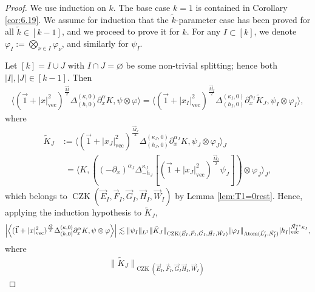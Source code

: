 \documentclass[11pt, reqno]{amsart}
\theoremstyle{definition}
\theoremstyle{remark}
\numberwithin{equation}{section}
\newcommand{\vE}{\vec E}
\newcommand{\vF}{\vec F}
\newcommand{\Bpair}[2]{\Big\langle #1, #2 \Big\rangle}
\newcommand{\abs}[1]{|#1|}
\newcommand{\Babs}[1]{\Big|#1\Big|}
\newcommand{\Norm}[2]{\|#1\|_{#2}}
\begin{document}
\begin{proof}
We use induction on $k$. The base case $k=1$ is contained in Corollary \ref{cor:6.19}. We assume for induction that the $\tilde k$-parameter case has been proved for all $\tilde k\in[k-1]$, and we proceed to prove it for $k$. For any $I\subset[k]$, we denote $\varphi_I:=\bigotimes_{\nu\in I}\varphi_\nu$, and similarly for $\psi_I$.

Let $[k]=I\cup J$ with $I\cap J=\varnothing$ be some non-trivial splitting; hence both $\abs{I},\abs{J}\in[k-1]$.
Then
\begin{equation*}
\begin{split}
  \Bpair{(\vec 1+\abs{x}_{\mathrm{vec}}^2)^{\frac{\vec M}{2}}\Delta_{(h,0)}^{(\kappa,0)}\partial_x^\alpha K}{\psi\otimes \varphi}
  = \Bpair{(\vec 1+\abs{x_I}_{\mathrm{vec}}^2)^{\frac{\vec M_I}{2}}\Delta_{(h_I,0)}^{(\kappa_I,0)}\partial_x^{\alpha_I}
    \tilde K_J
     }{\psi_I\otimes\varphi_I},
\end{split}
\end{equation*}
where
\begin{equation}\label{eq:tildeKJ}
\begin{split}
  \tilde K_J
  &:=
   \Bpair{ (\vec 1+\abs{x_J}_{\mathrm{vec}}^2)^{\frac{\vec M_J}{2}}\Delta_{(h_J,0)}^{(\kappa_J,0)}\partial_x^{\alpha_J} K}{\psi_J\otimes \varphi_J}_J  \\
   &\phantom{:}=
   \Bpair{K}{
   ((-\partial_x)^{\alpha_J}   \Delta_{-h_J}^{\kappa_J}[(\vec 1+\abs{x_J}_{\mathrm{vec}}^2)^{\frac{\vec M_J}{2}}\psi_J])\otimes \varphi_J}_J,
\end{split}
\end{equation}
which belongs to $\operatorname{CZK}(\vE_I,\vF_I,\vec G_I,\vec H_I,\vec W_I)$ by Lemma \ref{lem:T1=0rest}. Hence, applying the induction hypothesis to $\tilde K_J$,
\begin{equation*}
\begin{split}
  \Babs{\Bpair{(\vec 1+\abs{x}_{\mathrm{vec}}^2)^{\frac{\vec M}{2}}\Delta_{(h,0)}^{(\kappa,0)}\partial_x^\alpha K}{\psi\otimes \varphi}}
  \lesssim\Norm{\psi_I}{L^1}
   \Norm{\tilde K_J
    }{\operatorname{CZK}(\vE_I,\vF_I,\vec G_I,\vec H_I,\vec W_I)}
    \Norm{\varphi_I}{\operatorname{Atom}(\vec L_I',\vec N_I')}\abs{h_I}_{\rm{vec}}^{\vec N_I^{**}\kappa_I},
\end{split}
\end{equation*}
where
\begin{equation}\label{eq:normKJ}
\begin{split}
   \Norm{\tilde K_J}{\operatorname{CZK}(\vE_I,\vF_I,\vec G_I\vec H_I,\vec W_I)}

\end{split}
\end{equation}
\end{proof}
\end{document}
